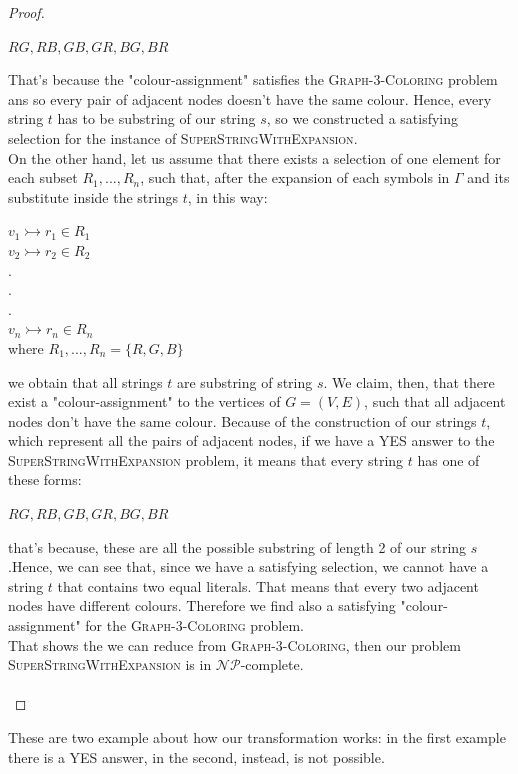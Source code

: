 \documentclass[paper=a4, fontsize=11pt]{scrartcl}
\numberwithin{equation}{section}		%
\numberwithin{figure}{section}			%
\numberwithin{table}{section}				%
\begin{document}
\begin{proof}
     \begin{center}
     	$RG, RB, GB, GR, BG, BR$
     \end{center}
     That's because the "colour-assignment" satisfies the \textsc{Graph-3-Coloring} problem ans so every pair of adjacent nodes doesn't have the same colour. Hence, every string $t$ has to be substring of our string $s$, so we constructed a satisfying selection for the instance of \textsc{SuperStringWithExpansion}. \newline
     \\
     \noindent On the other hand, let us assume that there exists a selection of one element for each subset $R_1,...,R_n$, such that, after the expansion of each symbols in $\Gamma$ and its substitute inside the strings $t$, in this way:
     \begin{center}
     	$v_1 \rightarrowtail r_1\in R_1$ \\
     	$v_2 \rightarrowtail r_2\in R_2$ \\
     	$.$ \\
     	$.$ \\
     	$.$ \\
     	$v_n \rightarrowtail r_n\in R_n$ \\
     	where $R_1,...,R_n = \{R,G,B\}$
     \end{center}
     we obtain that all strings $t$ are substring of string $s$. We claim, then, that there exist a "colour-assignment" to the vertices of $G=(V,E)$, such that all adjacent nodes don't have the same colour. Because of the construction of our strings $t$, which represent all the pairs of adjacent nodes, if we have a YES answer to the \textsc{SuperStringWithExpansion} problem, it means that every string $t$ has one of these forms:
     \begin{center}
     	$RG, RB, GB, GR, BG, BR$
     \end{center}
     that's because, these are all the possible substring of length 2 of our string $s$.Hence, we can see that, since we have a satisfying selection, we cannot have a string $t$ that contains two equal literals. That means that every two adjacent nodes have different colours. Therefore we find also a satisfying "colour-assignment" for the \textsc{Graph-3-Coloring} problem. \newline
     \\
     That shows the we can reduce from \textsc{Graph-3-Coloring}, then our problem \textsc{SuperStringWithExpansion} is in $\mathcal{NP}$-complete. \newline
     \\
     \\
    \end{proof}
     \noindent These are two example about how our transformation works: in the first example there is a YES answer, in the second, instead, is not possible. 
     
\end{document}
